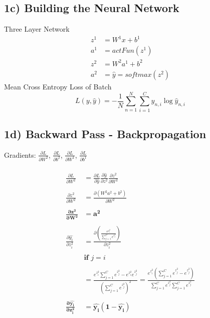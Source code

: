 \documentclass{article}
\begin{document}
\subsection*{1c) Building the Neural Network}
Three Layer Network
\begin{align}
	z^{1} &= W^{1}x + b^{1}\\
	a^{1} &=actFun(z^{1})\\
	z^{2} &=W^{2}a^{1}+b^{2}\\
	a^{2} &=\hat{y}=softmax(z^{2})
\end{align}
Mean Cross Entropy Loss of Batch
\begin{equation}
	L(y,\hat{y}) = -\frac{1}{N}\sum_{n=1}^{N}\sum_{i=1}^{C}y_{n,i}\log{\hat{y}_{n,i}}
\end{equation}

\subsection*{1d) Backward Pass - Backpropagation}
Gradients: $\frac{\partial L}{\partial W^{2}}$, $\frac{\partial L}{\partial b^{2}}$, $\frac{\partial L}{\partial W^{1}}$, $\frac{\partial L}{\partial b^{1}}$\\ \\
	\begin{align*}
		\frac{\partial L}{\partial W^{2}} &= \frac{\partial L}{\partial \hat{y}}\frac{\partial \hat{y}}{\partial z^{2}}\frac{\partial z^{2}}{\partial W^{2}}\\ \\
		\frac{\partial z^{2}}{\partial W^{2}} &= \frac{\partial (W^{2}a^{2}+b^{2})}{\partial W^{2}}\\ \\
		\boldsymbol{\frac{\partial z^{2}}{\partial W^{2}}}& \boldsymbol{=a^{2}}
	\\
	\\
		\frac{\partial \hat{y_i}}{\partial z_i^{2}} &= \frac{\partial \left(\frac{e^{z_i^2}}{\sum_{j=1}^Ce^{z_j^2}}\right)}{\partial z_i^2}\\ \\
		&  \textbf{if }   j = i\\ \\		
		& = \frac{e^{z_i^2}\sum_{j=1}^Ce^{z_j^2}-e^{z_i^2}e^{z_j^2}}{\left(\sum_{j=1}^Ce^{z_j^2}\right)^2} = \frac{e^{z_i^2}(\sum_{j=1}^Ce^{z_j^2}-e^{z_j^2})}{\sum_{j=1}^Ce^{z_j^2}\sum_{j=1}^Ce^{z_j^2}}\\ \\
		\boldsymbol{\frac{\partial \hat{y_i}}{\partial z_i^{2}}} & \boldsymbol{=\hat{y_i}(1-\hat{y_i})}
	\end{align*}
\end{document}
